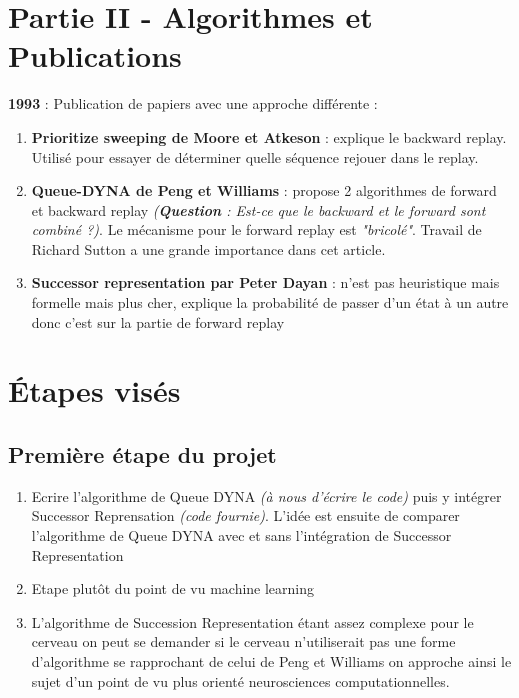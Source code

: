 \documentclass{article}
\begin{document}
\section{Partie II - Algorithmes et Publications}
\textbf{1993} : Publication de papiers avec une approche différente : 
\begin{enumerate}
    \item \textbf{Prioritize sweeping de Moore et Atkeson} : explique le backward replay. Utilisé pour essayer de déterminer quelle séquence rejouer dans le replay.
    \item \textbf{Queue-DYNA de Peng et Williams} : propose 2 algorithmes de forward et backward replay \textit{(\textbf{Question} : Est-ce que le backward et le forward sont combiné ?)}. Le mécanisme pour le forward replay est \textit{"bricolé"}. Travail de Richard Sutton a une grande importance dans cet article.
    \item \textbf{Successor representation par Peter Dayan} : n'est pas heuristique mais formelle mais plus cher, explique la probabilité de passer d'un état à un autre donc c'est sur la partie de forward replay
    
\end{enumerate}

\section{Étapes visés}
\subsection{Première étape du projet}
\begin{enumerate}
    \item Ecrire l’algorithme  de Queue DYNA \textit{(à nous d’écrire le code)} puis y intégrer Successor Reprensation \textit{(code fournie)}. L’idée est ensuite de comparer l’algorithme de Queue DYNA avec et sans l’intégration de Successor Representation
    \item Etape plutôt du point de vu machine learning 
    \item L’algorithme de Succession Representation étant assez complexe pour le cerveau on peut se demander si le cerveau n’utiliserait pas une forme d’algorithme se rapprochant de celui de Peng et Williams on approche ainsi le sujet d’un point de vu plus orienté neurosciences computationnelles.
\end{enumerate}
\end{document}
